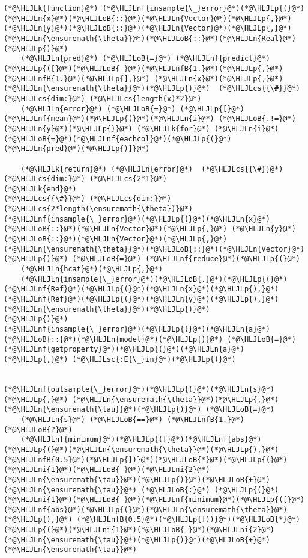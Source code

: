 \documentclass[12pt,a4paper]{article}
\newcommand{\HLJLk}[1]{\textcolor[RGB]{148,91,176}{\textbf{#1}}}
\newcommand{\HLJLn}[1]{#1}
\newcommand{\HLJLnf}[1]{\textcolor[RGB]{66,102,213}{#1}}
\newcommand{\HLJLsc}[1]{\textcolor[RGB]{201,61,57}{#1}}
\newcommand{\HLJLnfB}[1]{\textcolor[RGB]{59,151,46}{#1}}
\newcommand{\HLJLni}[1]{\textcolor[RGB]{59,151,46}{#1}}
\newcommand{\HLJLoB}[1]{\textcolor[RGB]{102,102,102}{\textbf{#1}}}
\newcommand{\HLJLp}[1]{#1}
\newcommand{\HLJLcs}[1]{\textcolor[RGB]{153,153,119}{\textit{#1}}}
\begin{document}
\begin{lstlisting}
(*@\HLJLk{function}@*) (*@\HLJLnf{insample{\_}error}@*)(*@\HLJLp{(}@*)(*@\HLJLn{x}@*)(*@\HLJLoB{::}@*)(*@\HLJLn{Vector}@*)(*@\HLJLp{,}@*) (*@\HLJLn{y}@*)(*@\HLJLoB{::}@*)(*@\HLJLn{Vector}@*)(*@\HLJLp{,}@*) (*@\HLJLn{\ensuremath{\theta}}@*)(*@\HLJLoB{::}@*)(*@\HLJLn{Real}@*)(*@\HLJLp{)}@*)
    (*@\HLJLn{pred}@*) (*@\HLJLoB{=}@*) (*@\HLJLnf{predict}@*)(*@\HLJLp{([}@*)(*@\HLJLoB{-}@*)(*@\HLJLnfB{1.}@*)(*@\HLJLp{,}@*) (*@\HLJLnfB{1.}@*)(*@\HLJLp{],}@*) (*@\HLJLn{x}@*)(*@\HLJLp{,}@*) (*@\HLJLn{\ensuremath{\theta}}@*)(*@\HLJLp{)}@*)  (*@\HLJLcs{{\#}}@*) (*@\HLJLcs{dim:}@*) (*@\HLJLcs{length(x)*2}@*)
    (*@\HLJLn{error}@*) (*@\HLJLoB{=}@*) (*@\HLJLp{[}@*)(*@\HLJLnf{mean}@*)(*@\HLJLp{(}@*)(*@\HLJLn{i}@*) (*@\HLJLoB{.!=}@*) (*@\HLJLn{y}@*)(*@\HLJLp{)}@*) (*@\HLJLk{for}@*) (*@\HLJLn{i}@*)(*@\HLJLoB{=}@*)(*@\HLJLnf{eachcol}@*)(*@\HLJLp{(}@*)(*@\HLJLn{pred}@*)(*@\HLJLp{)]}@*)

    (*@\HLJLk{return}@*) (*@\HLJLn{error}@*)  (*@\HLJLcs{{\#}}@*) (*@\HLJLcs{dim:}@*) (*@\HLJLcs{2*1}@*)
(*@\HLJLk{end}@*)
(*@\HLJLcs{{\#}}@*) (*@\HLJLcs{dim:}@*) (*@\HLJLcs{2*length(\ensuremath{\theta})}@*)
(*@\HLJLnf{insample{\_}error}@*)(*@\HLJLp{(}@*)(*@\HLJLn{x}@*)(*@\HLJLoB{::}@*)(*@\HLJLn{Vector}@*)(*@\HLJLp{,}@*) (*@\HLJLn{y}@*)(*@\HLJLoB{::}@*)(*@\HLJLn{Vector}@*)(*@\HLJLp{,}@*) (*@\HLJLn{\ensuremath{\theta}}@*)(*@\HLJLoB{::}@*)(*@\HLJLn{Vector}@*)(*@\HLJLp{)}@*) (*@\HLJLoB{=}@*) (*@\HLJLnf{reduce}@*)(*@\HLJLp{(}@*)
    (*@\HLJLn{hcat}@*)(*@\HLJLp{,}@*) 
    (*@\HLJLn{insample{\_}error}@*)(*@\HLJLoB{.}@*)(*@\HLJLp{(}@*)(*@\HLJLnf{Ref}@*)(*@\HLJLp{(}@*)(*@\HLJLn{x}@*)(*@\HLJLp{),}@*) (*@\HLJLnf{Ref}@*)(*@\HLJLp{(}@*)(*@\HLJLn{y}@*)(*@\HLJLp{),}@*) (*@\HLJLn{\ensuremath{\theta}}@*)(*@\HLJLp{)}@*)
(*@\HLJLp{)}@*)
(*@\HLJLnf{insample{\_}error}@*)(*@\HLJLp{(}@*)(*@\HLJLn{a}@*)(*@\HLJLoB{::}@*)(*@\HLJLn{model}@*)(*@\HLJLp{)}@*) (*@\HLJLoB{=}@*) (*@\HLJLnf{getproperty}@*)(*@\HLJLp{(}@*)(*@\HLJLn{a}@*)(*@\HLJLp{,}@*) (*@\HLJLsc{:E{\_}in}@*)(*@\HLJLp{)}@*)


(*@\HLJLnf{outsample{\_}error}@*)(*@\HLJLp{(}@*)(*@\HLJLn{s}@*)(*@\HLJLp{,}@*) (*@\HLJLn{\ensuremath{\theta}}@*)(*@\HLJLp{,}@*) (*@\HLJLn{\ensuremath{\tau}}@*)(*@\HLJLp{)}@*) (*@\HLJLoB{=}@*) 
    (*@\HLJLn{s}@*) (*@\HLJLoB{==}@*) (*@\HLJLnfB{1.}@*) (*@\HLJLoB{?}@*) 
    (*@\HLJLnf{minimum}@*)(*@\HLJLp{([}@*)(*@\HLJLnf{abs}@*)(*@\HLJLp{(}@*)(*@\HLJLn{\ensuremath{\theta}}@*)(*@\HLJLp{),}@*) (*@\HLJLnfB{0.5}@*)(*@\HLJLp{])}@*)(*@\HLJLoB{*}@*)(*@\HLJLp{(}@*)(*@\HLJLni{1}@*)(*@\HLJLoB{-}@*)(*@\HLJLni{2}@*)(*@\HLJLn{\ensuremath{\tau}}@*)(*@\HLJLp{)}@*)(*@\HLJLoB{+}@*)(*@\HLJLn{\ensuremath{\tau}}@*) (*@\HLJLoB{:}@*) (*@\HLJLp{(}@*)(*@\HLJLni{1}@*)(*@\HLJLoB{-}@*)(*@\HLJLnf{minimum}@*)(*@\HLJLp{([}@*)(*@\HLJLnf{abs}@*)(*@\HLJLp{(}@*)(*@\HLJLn{\ensuremath{\theta}}@*)(*@\HLJLp{),}@*) (*@\HLJLnfB{0.5}@*)(*@\HLJLp{]))}@*)(*@\HLJLoB{*}@*)(*@\HLJLp{(}@*)(*@\HLJLni{1}@*)(*@\HLJLoB{-}@*)(*@\HLJLni{2}@*)(*@\HLJLn{\ensuremath{\tau}}@*)(*@\HLJLp{)}@*)(*@\HLJLoB{+}@*)(*@\HLJLn{\ensuremath{\tau}}@*)



\end{lstlisting}
\end{document}
